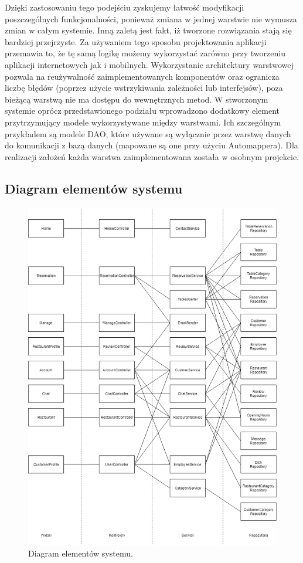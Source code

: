 \documentclass{article}
\begin{document}
Dzięki zastosowaniu tego podejściu zyskujemy łatwość modyfikacji poszczególnych funkcjonalności, ponieważ zmiana w jednej warstwie nie wymusza zmian w całym systemie. Inną zaletą jest fakt, iż tworzone rozwiązania stają się bardziej przejrzyste. Za używaniem tego sposobu projektowania aplikacji przemawia to, że tę samą logikę możemy wykorzystać zarówno przy tworzeniu aplikacji internetowych jak i mobilnych. Wykorzystanie architektury warstwowej pozwala na reużywalność zaimplementowanych komponentów oraz ogranicza liczbę błędów (poprzez użycie wstrzykiwania zależności lub interfejsów), poza bieżącą warstwą nie ma dostępu do wewnętrznych metod. W stworzonym systemie oprócz przedstawionego podziału wprowadzono dodatkowy element przytrzymujący modele wykorzystywane między warstwami. Ich szczególnym przykładem są modele DAO, które używane są wyłącznie przez warstwę danych do komunikacji z bazą danych (mapowane są one przy użyciu Automappera). Dla realizacji założeń każda warstwa zaimplementowana została w osobnym projekcie.

\subsection{Diagram elementów systemu}

\begin{figure}[H]
\centering
	\includegraphics[width=1.00\textwidth]{system.png}
	\caption[caption]{Diagram elementów systemu.}
	\label{fig:system}
\end{figure}
\end{document}
